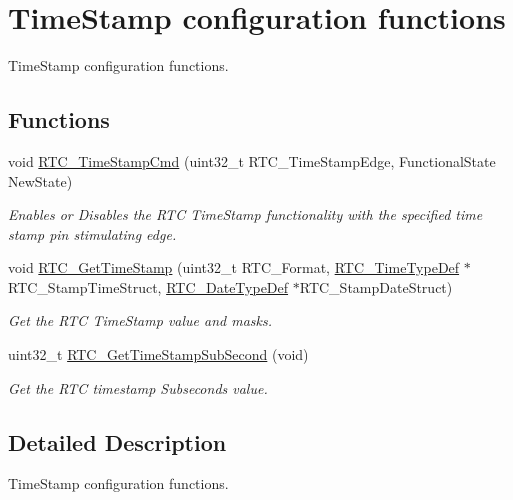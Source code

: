 \hypertarget{group___r_t_c___group8}{}\section{Time\+Stamp configuration functions}
\label{group___r_t_c___group8}


Time\+Stamp configuration functions.  


\subsection*{Functions}
\begin{DoxyCompactItemize}
\item 
void \hyperlink{group___r_t_c___group8_ga7d80fa4a2c87654598d8207154ac8e96}{R\+T\+C\+\_\+\+Time\+Stamp\+Cmd} (uint32\+\_\+t R\+T\+C\+\_\+\+Time\+Stamp\+Edge, Functional\+State New\+State)
\begin{DoxyCompactList}\small\item\em Enables or Disables the R\+T\+C Time\+Stamp functionality with the specified time stamp pin stimulating edge. \end{DoxyCompactList}\item 
void \hyperlink{group___r_t_c___group8_ga44c38b0c74e9e960a4263b2905f44796}{R\+T\+C\+\_\+\+Get\+Time\+Stamp} (uint32\+\_\+t R\+T\+C\+\_\+\+Format, \hyperlink{struct_r_t_c___time_type_def}{R\+T\+C\+\_\+\+Time\+Type\+Def} $\ast$R\+T\+C\+\_\+\+Stamp\+Time\+Struct, \hyperlink{struct_r_t_c___date_type_def}{R\+T\+C\+\_\+\+Date\+Type\+Def} $\ast$R\+T\+C\+\_\+\+Stamp\+Date\+Struct)
\begin{DoxyCompactList}\small\item\em Get the R\+T\+C Time\+Stamp value and masks. \end{DoxyCompactList}\item 
uint32\+\_\+t \hyperlink{group___r_t_c___group8_ga2b0ef81f4959a2f9fc6361fbda759b00}{R\+T\+C\+\_\+\+Get\+Time\+Stamp\+Sub\+Second} (void)
\begin{DoxyCompactList}\small\item\em Get the R\+T\+C timestamp Subseconds value. \end{DoxyCompactList}\end{DoxyCompactItemize}


\subsection{Detailed Description}
Time\+Stamp configuration functions. 

